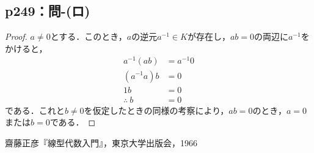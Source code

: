 \documentclass[a4paper,10pt,fleqn]{ltjsarticle}
\begin{document}
\subsection*{p249：問-(ロ)}
\begin{tleftbar}
    \begin{proof}
        $a \ne 0$とする．このとき，$a$の逆元$a^{-1} \in K$が存在し，$ab=0$の両辺に$a^{-1}$をかけると，
        \begin{align*}
            a^{-1} (ab)   & = a^{-1} 0 \\
            (a^{-1}a)b    & =0         \\
            1b            & =0         \\
            \therefore~ b & =0
        \end{align*}
        である．これと$b \ne 0$を仮定したときの同様の考察により，$ab=0$のとき，$a=0$または$b=0$である．
    \end{proof}
\end{tleftbar}

\begin{thebibliography}{9}
     齋藤正彦『線型代数入門』，東京大学出版会，1966
\end{thebibliography}
\end{document}
